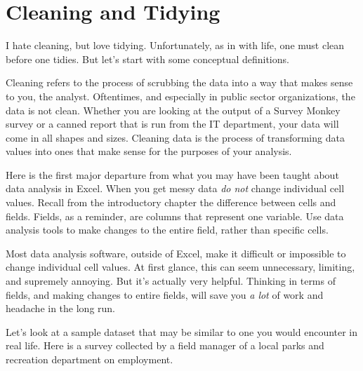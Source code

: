 \documentclass[
]{book}
\begin{document}
\hypertarget{cleaning-and-tidying}{%
\section{Cleaning and Tidying}\label{cleaning-and-tidying}}

I hate cleaning, but love tidying. Unfortunately, as in with life, one must clean before one tidies. But let's start with some conceptual definitions.

Cleaning refers to the process of scrubbing the data into a way that makes sense to you, the analyst. Oftentimes, and especially in public sector organizations, the data is not clean. Whether you are looking at the output of a Survey Monkey survey or a canned report that is run from the IT department, your data will come in all shapes and sizes. Cleaning data is the process of transforming data values into ones that make sense for the purposes of your analysis.

Here is the first major departure from what you may have been taught about data analysis in Excel. When you get messy data \emph{do not} change individual cell values. Recall from the introductory chapter the difference between cells and fields. Fields, as a reminder, are columns that represent one variable. Use data analysis tools to make changes to the entire field, rather than specific cells.

Most data analysis software, outside of Excel, make it difficult or impossible to change individual cell values. At first glance, this can seem unnecessary, limiting, and supremely annoying. But it's actually very helpful. Thinking in terms of fields, and making changes to entire fields, will save you \emph{a lot} of work and headache in the long run.

Let's look at a sample dataset that may be similar to one you would encounter in real life. Here is a survey collected by a field manager of a local parks and recreation department on employment.
\end{document}
